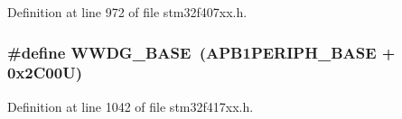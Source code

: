 Definition at line 972 of file stm32f407xx.\+h.

\subsubsection[{\texorpdfstring{W\+W\+D\+G\+\_\+\+B\+A\+SE}{WWDG_BASE}}]{\setlength{\rightskip}{0pt plus 5cm}\#define W\+W\+D\+G\+\_\+\+B\+A\+SE~({\bf A\+P\+B1\+P\+E\+R\+I\+P\+H\+\_\+\+B\+A\+SE} + 0x2\+C00\+U)}\hypertarget{group___peripheral__registers__structures_ga9a5bf4728ab93dea5b569f5b972cbe62}{}\label{group___peripheral__registers__structures_ga9a5bf4728ab93dea5b569f5b972cbe62}


Definition at line 1042 of file stm32f417xx.\+h.

